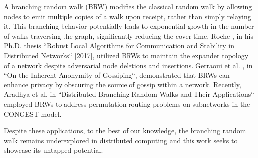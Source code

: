     A branching random walk \cite{shi2015branching} (BRW) modifies the classical random walk by allowing nodes to emit multiple copies of a walk upon receipt, rather than simply relaying it. This branching behavior potentially leads to exponential growth in the number of walks traversing the graph, significantly reducing the cover time. Roche \cite{roche2017robust}, in his Ph.D. thesis ``Robust Local Algorithms for Communication and Stability in Distributed Networks`` [2017], utilized BRWs to maintain the expander topology of a network despite adversarial node deletions and insertions. Gerraoui et al. \cite{guerraoui2023inherent}, in ``On the Inherent Anonymity of Gossiping``, demonstrated that BRWs can enhance privacy by obscuring the source of gossip within a network. Recently, Aradhya et al. \cite{aradhya_et_al:LIPIcs.OPODIS.2024.36} in ``Distributed Branching Random Walks and Their Applications`` employed BRWs to address permutation routing problems on subnetworks in the CONGEST model.

    Despite these applications, to the best of our knowledge, the branching random walk remains underexplored in distributed computing and this work seeks to showcase its untapped potential.